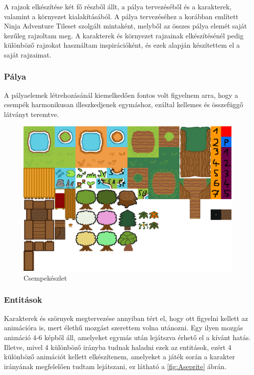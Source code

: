  A rajzok elkészítése két fő részből állt, a pálya tervezéséből és a karakterek, valamint a környezet kialakításából. A pálya tervezéséhez a korábban említett Ninja Adventure Tileset szolgált mintaként, melyből az összes pálya elemét saját kezűleg rajzoltam meg. A karakterek és környezet rajzainak elkészítésénél pedig különböző rajzokat használtam inspirációként, és ezek alapján készítettem el a saját rajzaimat.

\subsubsection{Pálya}
 A pályaelemek létrehozásánál kiemelkedően fontos volt figyelnem arra, hogy a csempék harmonikusan illeszkedjenek egymáshoz, ezáltal kellemes és összefüggő látványt teremtve.

\begin{figure}[H]
    \centering
    \includegraphics[width=12.0truecm]{images/tileset.png}
    \caption{Csempekészlet}
    \label{fig:Csempekészlet}
\end{figure}

\subsubsection{Entitások}
 Karakterek és szörnyek megtervezése annyiban tért el, hogy ott figyelni kellett az animációra is, mert élethű mozgást szerettem volna utánozni. Egy ilyen mozgás animáció 4-6 képből áll, amelyeket egymás után lejátszva érhető el a kívánt hatás. Illetve, mivel 4 különböző irányba tudnak haladni ezek az entitások, ezért 4 különböző animációt kellett elkészítenem, amelyeket a játék során a karakter irányának megfelelően tudtam lejátszani, ez látható a \ref{fig:Aseprite} ábrán.

